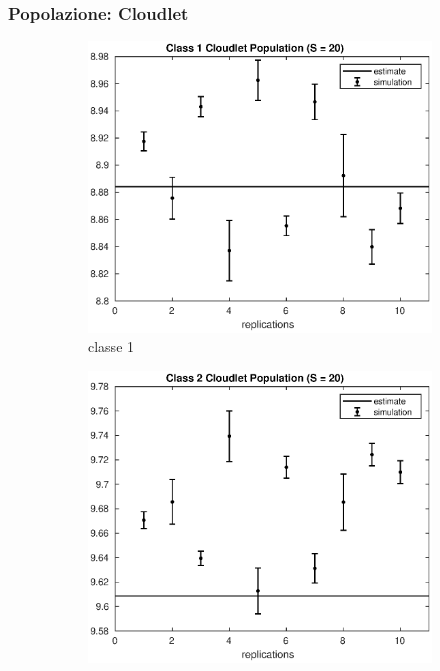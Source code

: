 \subsubsection{Popolazione: Cloudlet}
%
\begin{figure}[!h]
\centering
%
\begin{subfigure}[t]{0.49\textwidth}
\includegraphics[width=\textwidth]{figures/simul/20_500K_n1clet}
\caption{classe 1}
\label{20_n1clet}
\end{subfigure}
%
\begin{subfigure}[t]{0.49\textwidth}
\includegraphics[width=\textwidth]{figures/simul/20_500K_n2clet}

\end{subfigure}
\end{figure}
